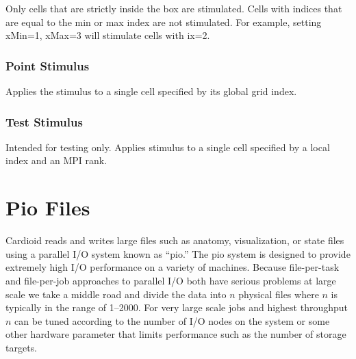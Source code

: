 \documentclass{article}
\begin{document}

  Only cells
that are strictly inside the box are stimulated.  Cells with indices
that are equal to the min or max index are not stimulated.  For example,
setting xMin=1, xMax=3 will stimulate cells with ix=2.

\subsubsection{Point Stimulus}
Applies the stimulus to a single cell specified by its global grid index.

\begin{keywords}
\end{keywords}

\subsubsection{Test Stimulus}
Intended for testing only.  Applies stimulus to a single cell specified
by a local index and an MPI rank.

\begin{keywords}
\end{keywords}


\section{Pio Files}
\label{sec:pio}

Cardioid reads and writes large files such as anatomy, visualization, or
state files using a parallel I/O system known as ``pio.''  The pio
system is designed to provide extremely high I/O performance on a
variety of machines.  Because file-per-task and file-per-job approaches
to parallel I/O both have serious problems at large scale we take a
middle road and divide the data into $n$ physical files where $n$ is
typically in the range of 1--2000.  For very large scale jobs and
highest throughput $n$ can be tuned according to the number of I/O nodes
on the system or some other hardware parameter that limits performance
such as the number of storage targets.
\end{document}
